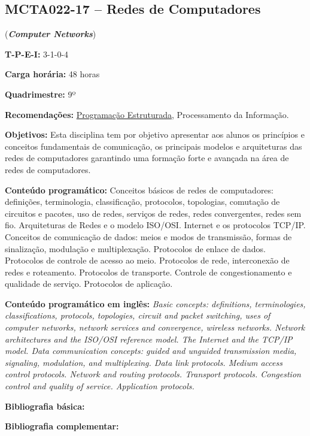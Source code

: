 \documentclass[class=article, crop=false]{standalone}
\begin{document}
\subsection*{MCTA022-17 -- Redes de Computadores}
\label{disc:redes}

(\textbf{\textit{Computer Networks}})

\begin{center}
    \begin{minipage}{0.85\textwidth}
        \textbf{T-P-E-I:} 3-1-0-4
        
        \textbf{Carga horária:} 48 horas
        
        \textbf{Quadrimestre:} 9º
        
        \textbf{Recomendações:} 
        \hyperref[disc:pe]{Programação Estruturada},
        Processamento da Informação.
    \end{minipage}
\end{center}

\textbf{Objetivos:}
Esta disciplina tem por objetivo apresentar aos alunos os princípios e
conceitos fundamentais de comunicação, os principais modelos e arquiteturas das
redes de computadores garantindo uma formação forte e avançada na área de redes
de computadores. 

\textbf{Conteúdo programático:}
Conceitos básicos de redes de computadores: definições, terminologia,
classificação, protocolos, topologias, comutação de circuitos e pacotes, uso de
redes, serviços de redes, redes convergentes, redes sem fio. 
Arquiteturas de Redes e o modelo ISO/OSI. 
Internet e os protocolos TCP/IP. 
Conceitos de comunicação de dados: meios e modos de transmissão, formas de
sinalização, modulação e multiplexação. 
Protocolos de enlace de dados. 
Protocolos de controle de acesso ao meio. 
Protocolos de rede, interconexão de redes e roteamento. 
Protocolos de transporte. 
Controle de congestionamento e qualidade de serviço. 
Protocolos de aplicação. 

\textbf{Conteúdo programático em inglês:}
\textit{Basic concepts: definitions, terminologies, classifications, protocols, topologies, circuit and packet switching, uses of computer networks, network services and convergence, wireless networks.
Network architectures and the ISO/OSI reference model. 
The Internet and the TCP/IP model. 
Data communication concepts: guided and unguided transmission media, signaling, modulation, and multiplexing. 
Data link protocols. 
Medium access control protocols. 
Network and routing protocols. 
Transport protocols. 
Congestion control and quality of service. 
Application protocols.}

\newrefsection
\textbf{Bibliografia básica:}
\nocite{2003-tanenbaum, 2008-fourozan, 2010-kurose}
\printbibliography

\newrefsection
\textbf{Bibliografia complementar:}
\nocite{2005-halsall, 2007-comer, 2005-stallings, 2007-peterson, 2011-souza}
\printbibliography
\end{document}
